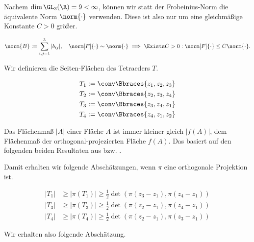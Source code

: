 \begin{solution}
Nachem $\dim \GL_3(\R) = 9 < \infty$, können wir statt der Frobeinius-Norm die äquivalente Norm $\norm{\cdot}$ verwenden.
Diese ist also nur um eine gleichmäßige Konstante $C > 0$ größer.

\begin{align*}
  \norm{B}
  :=
  \sum_{i,j=1}^3 |b_{ij}|,
  \quad
  \norm[F]{\cdot}
  \sim
  \norm{\cdot}
  \implies
  \Exists C > 0:
  \norm[F]{\cdot}
  \leq
  C \norm{\cdot}.
\end{align*}

Wir definieren die Seiten-Flächen des Tetraeders $T$.

\begin{align*}
  T_1 & := \conv \Bbraces{z_1, z_2, z_3} \\
  T_2 & := \conv \Bbraces{z_2, z_3, z_4} \\
  T_3 & := \conv \Bbraces{z_3, z_4, z_1} \\
  T_4 & := \conv \Bbraces{z_4, z_1, z_2}
\end{align*}

Das Flächenmaß $|A|$ einer Fläche $A$ ist immer kleiner gleich $|f(A)|$, dem Flächenmaß der orthogonal-projezierten Fläche $f(A)$.
Das basiert auf den folgenden beiden Resultaten aus \cite{Ana3} bzw. \cite{FAna1}.


Damit erhalten wir folgende Abschätzungen, wenn $\pi$ eine orthogonale Projektion ist.

\begin{align*}
  |T_1| & \geq |\pi(T_1)| \geq \frac{1}{2} \det(\pi(z_3 - z_1), \pi (z_4 - z_1)) \\
  |T_3| & \geq |\pi(T_3)| \geq \frac{1}{2} \det(\pi(z_2 - z_1), \pi (z_4 - z_1)) \\
  |T_4| & \geq |\pi(T_4)| \geq \frac{1}{2} \det(\pi(z_2 - z_1), \pi (z_3 - z_1))
\end{align*}

Wir erhalten also folgende Abschätzung.


\end{solution}
